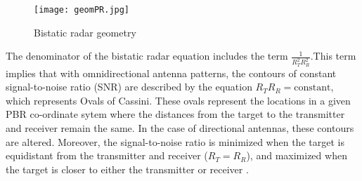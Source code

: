 \begin{figure}[htbp]
    \centering
    \texttt{[image: geomPR.jpg]}
    \caption{Bistatic radar geometry \cite{FundamentalsPassiveRadar}}
    \label{fig:geometry}
\end{figure}

\par \vspace{0.5cm}
\noindent The denominator of the bistatic radar equation includes the term \( \frac{1}{R_T^2 R_R^2} \).This term implies that with omnidirectional antenna patterns, the contours of constant signal-to-noise ratio (SNR) are described by the equation \( R_T R_R = \text{constant} \), which represents Ovals of Cassini. These ovals represent the locations in a given PBR co-ordinate sytem where the distances from the target to the transmitter and receiver remain the same. In the case of directional antennas, these contours are altered. Moreover, the signal-to-noise ratio is minimized when the target is equidistant from the transmitter and receiver (\( R_T = R_R \)), and maximized when the target is closer to either the transmitter or receiver \cite{FundamentalsPassiveRadar}.

\par \vspace{0.5cm} 

